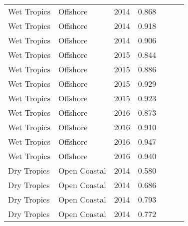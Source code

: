 {\begin{longtable}{llccccc}
  Wet Tropics & Offshore & 2014 & 0.868 & \cellcolor[HTML]{00734D}{A} & \cellcolor[HTML]{00734D}{A} & \cellcolor[HTML]{00734D}{A} \\ 
  Wet Tropics & Offshore & 2014 & 0.918 & \cellcolor[HTML]{00734D}{A} & \cellcolor[HTML]{00734D}{A} & \cellcolor[HTML]{00734D}{A} \\ 
  Wet Tropics & Offshore & 2014 & 0.906 & \cellcolor[HTML]{00734D}{A} & \cellcolor[HTML]{00734D}{A} & \cellcolor[HTML]{00734D}{A} \\ 
  Wet Tropics & Offshore & 2015 & 0.844 & \cellcolor[HTML]{00734D}{A} & \cellcolor[HTML]{00734D}{A} & \cellcolor[HTML]{B0D235}{B} \\ 
  Wet Tropics & Offshore & 2015 & 0.886 & \cellcolor[HTML]{00734D}{A} & \cellcolor[HTML]{00734D}{A} & \cellcolor[HTML]{00734D}{A} \\ 
  Wet Tropics & Offshore & 2015 & 0.929 & \cellcolor[HTML]{00734D}{A} & \cellcolor[HTML]{00734D}{A} & \cellcolor[HTML]{00734D}{A} \\ 
  Wet Tropics & Offshore & 2015 & 0.923 & \cellcolor[HTML]{00734D}{A} & \cellcolor[HTML]{00734D}{A} & \cellcolor[HTML]{00734D}{A} \\ 
  Wet Tropics & Offshore & 2016 & 0.873 & \cellcolor[HTML]{00734D}{A} & \cellcolor[HTML]{00734D}{A} & \cellcolor[HTML]{00734D}{A} \\ 
  Wet Tropics & Offshore & 2016 & 0.910 & \cellcolor[HTML]{00734D}{A} & \cellcolor[HTML]{00734D}{A} & \cellcolor[HTML]{00734D}{A} \\ 
  Wet Tropics & Offshore & 2016 & 0.947 & \cellcolor[HTML]{00734D}{A} & \cellcolor[HTML]{00734D}{A} & \cellcolor[HTML]{00734D}{A} \\ 
  Wet Tropics & Offshore & 2016 & 0.940 & \cellcolor[HTML]{00734D}{A} & \cellcolor[HTML]{00734D}{A} & \cellcolor[HTML]{00734D}{A} \\ 
  Dry Tropics & Open Coastal & 2014 & 0.580 & \cellcolor[HTML]{F0C918}{C} & \cellcolor[HTML]{F0C918}{C} & \cellcolor[HTML]{F0C918}{C} \\ 
  Dry Tropics & Open Coastal & 2014 & 0.686 & \cellcolor[HTML]{B0D235}{B} & \cellcolor[HTML]{B0D235}{B} & \cellcolor[HTML]{B0D235}{B} \\ 
  Dry Tropics & Open Coastal & 2014 & 0.793 & \cellcolor[HTML]{B0D235}{B} & \cellcolor[HTML]{B0D235}{B} & \cellcolor[HTML]{B0D235}{B} \\ 
  Dry Tropics & Open Coastal & 2014 & 0.772 & \cellcolor[HTML]{B0D235}{B} & \cellcolor[HTML]{B0D235}{B} & \cellcolor[HTML]{B0D235}{B} \\ 

\end{longtable}}
